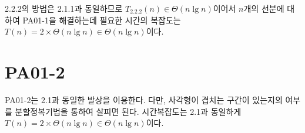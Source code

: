 \documentclass[10pt,a4paper]{article}
\begin{document}
\begin{spacing}{1.6}
  2.2.2의 방법은 2.1.1과 동일하므로 $T_{2.2.2}(n) \in \Theta(n\lg{n})$이어서 $n$개의 선분에 대하여 PA01-1을 해결하는데 필요한 시간의 복잡도는 $T(n) = 2 \times \Theta(n\lg{n}) \in \Theta(n\lg{n}) $이다.
  
\section{PA01-2}
  PA01-2는 2.1과 동일한 발상을 이용한다. 다만, 사각형이 겹치는 구간이 있는지의 여부를 분할정복기법을 통하여 살피면 된다. 시간복잡도는 2.1과 동일하게 $T(n) = 2 \times \Theta(n\lg{n}) \in \Theta(n\lg{n}) $이다. 
 
\end{spacing}
\end{document}
